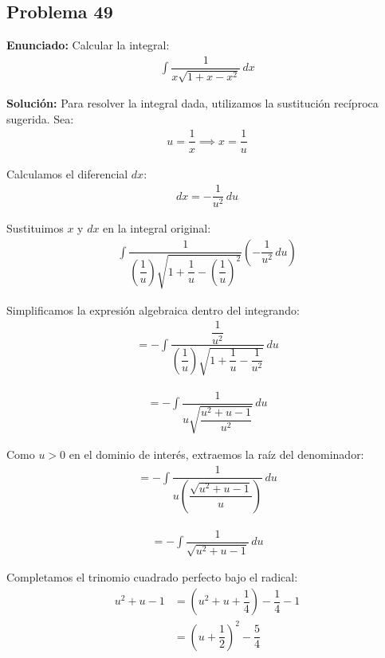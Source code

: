 \subsection*{Problema 49}
\textbf{Enunciado:} Calcular la integral:
\begin{align*}
\int \dfrac{1}{x \sqrt{1 + x - x^2}} \, dx
\end{align*}

\textbf{Solución:} Para resolver la integral dada, utilizamos la sustitución recíproca sugerida. Sea:
\begin{align*}
u = \dfrac{1}{x} \implies x = \dfrac{1}{u}
\end{align*}

Calculamos el diferencial $dx$:
\begin{align*}
dx = -\dfrac{1}{u^2} \, du
\end{align*}

Sustituimos $x$ y $dx$ en la integral original:
\begin{align*}
\int \dfrac{1}{\left(\dfrac{1}{u}\right) \sqrt{1 + \dfrac{1}{u} - \left(\dfrac{1}{u}\right)^2}} \left(-\dfrac{1}{u^2} \, du\right)
\end{align*}

Simplificamos la expresión algebraica dentro del integrando:
\begin{align*}
= -\int \dfrac{\dfrac{1}{u^2}}{\left(\dfrac{1}{u}\right) \sqrt{1 + \dfrac{1}{u} - \dfrac{1}{u^2}}} \, du
\end{align*}

\begin{align*}
= -\int \dfrac{1}{u \sqrt{\dfrac{u^2 + u - 1}{u^2}}} \, du
\end{align*}

Como $u > 0$ en el dominio de interés, extraemos la raíz del denominador:
\begin{align*}
= -\int \dfrac{1}{u \left(\dfrac{\sqrt{u^2 + u - 1}}{u}\right)} \, du
\end{align*}

\begin{align*}
= -\int \dfrac{1}{\sqrt{u^2 + u - 1}} \, du
\end{align*}

Completamos el trinomio cuadrado perfecto bajo el radical:
\begin{align*}
u^2 + u - 1 &= \left(u^2 + u + \dfrac{1}{4}\right) - \dfrac{1}{4} - 1 \\
&= \left(u + \dfrac{1}{2}\right)^2 - \dfrac{5}{4}
\end{align*}

